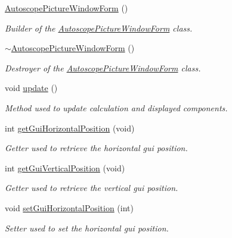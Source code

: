 \begin{DoxyCompactItemize}
\item 
\mbox{\hyperlink{class_autoscope_picture_window_form_ac7e1f8a94457cce24469119ea3214f8a}{Autoscope\+Picture\+Window\+Form}} ()
\begin{DoxyCompactList}\small\item\em Builder of the \mbox{\hyperlink{class_autoscope_picture_window_form}{Autoscope\+Picture\+Window\+Form}} class. \end{DoxyCompactList}\item 
\mbox{\hyperlink{class_autoscope_picture_window_form_a0ac8bae5bd9b170aea179812f0f516be}{$\sim$\+Autoscope\+Picture\+Window\+Form}} ()
\begin{DoxyCompactList}\small\item\em Destroyer of the \mbox{\hyperlink{class_autoscope_picture_window_form}{Autoscope\+Picture\+Window\+Form}} class. \end{DoxyCompactList}\item 
void \mbox{\hyperlink{class_autoscope_picture_window_form_a84ad64e4121c67a3269f935e50cfee2c}{update}} ()
\begin{DoxyCompactList}\small\item\em Method used to update calculation and displayed components. \end{DoxyCompactList}\item 
int \mbox{\hyperlink{class_autoscope_picture_window_form_ad9fa74865956b50029f0e2692ab256c8}{get\+Gui\+Horizontal\+Position}} (void)
\begin{DoxyCompactList}\small\item\em Getter used to retrieve the horizontal gui position. \end{DoxyCompactList}\item 
int \mbox{\hyperlink{class_autoscope_picture_window_form_ad7eeabfc680448ec5f663f7c68f6e3f4}{get\+Gui\+Vertical\+Position}} (void)
\begin{DoxyCompactList}\small\item\em Getter used to retrieve the vertical gui position. \end{DoxyCompactList}\item 
void \mbox{\hyperlink{class_autoscope_picture_window_form_a1a3b45dad146565be0f597e1b11cb910}{set\+Gui\+Horizontal\+Position}} (int)
\begin{DoxyCompactList}\small\item\em Setter used to set the horizontal gui position. \end{DoxyCompactList}\item 

\end{DoxyCompactItemize}
